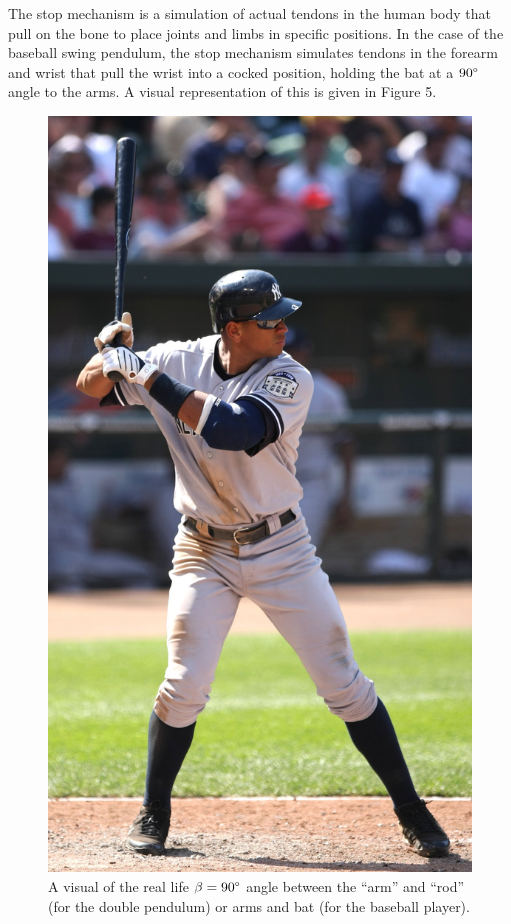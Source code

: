 \documentclass[%
 aip,
 amsmath,amssymb,
 reprint,%
 floatfix,%
]{revtex4-1}
\begin{document}
The stop mechanism is a simulation of actual tendons in the human body that pull on the bone to place joints and limbs in specific positions. In the case of the baseball swing pendulum, the stop mechanism simulates tendons in the forearm and wrist that pull the wrist into a cocked position, holding the bat at a $90\degree$ angle to the arms. A visual representation of this is given in Figure 5.

\begin{figure}[H]
	\centering
	\includegraphics[scale=0.1]{arod.jpg}
	\caption{A visual of the real life $\beta=90\degree$ angle between the “arm” and “rod” (for the double pendulum) or arms and bat (for the baseball player).}
\end{figure}
\end{document}
